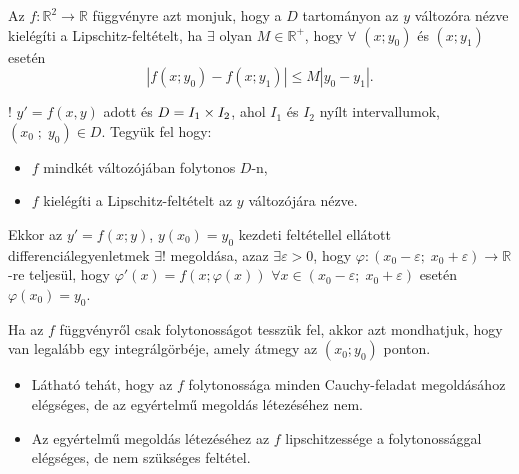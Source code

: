 \documentclass[main.tex]{subfiles}
\begin{document}




Az $f : \mathbb{R}^2 \rightarrow \mathbb{R}$ függvényre azt monjuk,
hogy  a $D$ tartományon az $y$ változóra nézve kielégíti a
Lipschitz-feltételt, ha $\exists$ olyan $M \in \mathbb{R}^+$, hogy
$\forall$ $\left( x; y_0 \right)$ és $\left( x; y_1 \right)$ esetén
\begin{equation*}
  \left| f(x; y_0) - f(x; y_1) \right| \leq M \left| y_0 - y_1 \right|.
\end{equation*}




! $y' = f(x, y)$ adott és $D = I_1 \times I_2$,
ahol $I_1$ és $I_2$ nyílt intervallumok,
$\left( x_0 \; ; \; y_0 \right) \in D$.
Tegyük fel hogy:
\begin{itemize}
  \item $f$ mindkét változójában folytonos $D$-n,
  \item $f$ kielégíti a Lipschitz-feltételt az $y$
        változójára nézve.
\end{itemize}
Ekkor az $y' = f(x; y)$, $y(x_0) = y_0$ kezdeti feltétellel
ellátott differenciálegyenletmek $\exists!$ megoldása, azaz
$\exists \varepsilon > 0$, hogy $\varphi :
  \left( x_0 - \varepsilon; \; x_0 + \varepsilon \right)
  \rightarrow \mathbb{R}$-re teljesül, hogy $\varphi' (x)
  = f \left(x ; \varphi(x)\right)$
$\forall x \in \left( x_0 - \varepsilon; \; x_0 + \varepsilon \right)$
esetén $\varphi(x_0) = y_0$.




Ha az $f$ függvényről csak folytonosságot tesszük fel,
akkor azt mondhatjuk, hogy van legalább egy integrálgörbéje,
amely átmegy az $\left( x_0 ; y_0 \right)$ ponton.



\begin{itemize}
  \item Látható tehát, hogy az $f$ folytonossága minden
        Cauchy-feladat megoldásához elégséges, de az egyértelmű
        megoldás létezéséhez nem.

  \item Az egyértelmű megoldás létezéséhez az $f$
        lipschitzessége a folytonossággal elégséges,
        de nem szükséges feltétel.
\end{itemize}
\end{document}
